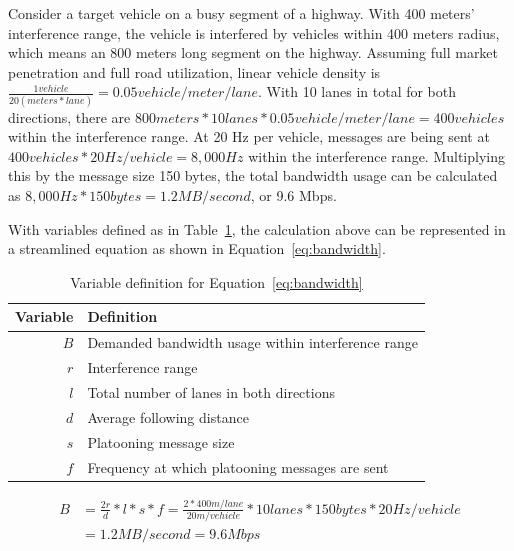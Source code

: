 \documentclass[12pt]{report}
\begin{document}
Consider a target vehicle on a busy segment of a highway. With 400 meters' interference range, the vehicle is interfered by vehicles within 400 meters radius, which means an 800 meters long segment on the highway. Assuming full market penetration and full road utilization, linear vehicle density is $\frac{1 vehicle}{20 (meters*lane)}=0.05 vehicle/meter/lane$. With 10 lanes in total for both directions, there are $800 meters * 10 lanes * 0.05 vehicle/meter/lane = 400 vehicles$ within the interference range. At 20 Hz per vehicle, messages are being sent at $400 vehicles * 20 Hz/vehicle=8,000 Hz$ within the interference range. Multiplying this by the message size 150 bytes, the total bandwidth usage can be calculated as $8,000 Hz * 150 bytes = 1.2 MB/second$, or 9.6 Mbps.

With variables defined as in Table~\ref{tab:bandwidth_equation_variable}, the calculation above can be represented in a streamlined equation as shown in Equation~\ref{eq:bandwidth}.

\begin{table}[h]
  \begin{center}
    \begin{tabular}{r l}
      \hline
      Variable & Definition \\ \hline
      $B$ & Demanded bandwidth usage within interference range \\
      $r$ & Interference range \\
      $l$ & Total number of lanes in both directions \\
      $d$ & Average following distance \\
      $s$ & Platooning message size \\
      $f$ & Frequency at which platooning messages are sent \\ \hline
    \end{tabular}
    \caption{\label{tab:bandwidth_equation_variable}Variable definition for Equation~\ref{eq:bandwidth}}
  \end{center}
\end{table}

\begin{equation}
  \begin{split}
    B & = \frac{2r}{d} * l * s * f = \frac{2 * 400m/lane}{20m/vehicle} * 10 lanes * 150 bytes * 20 Hz/vehicle \\
      & = 1.2 MB/second = 9.6 Mbps
  \end{split}
  \label{eq:bandwidth}
\end{equation}
\end{document}
